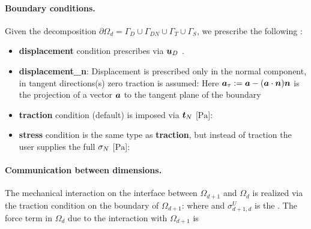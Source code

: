 \paragraph{Boundary conditions.}
Given the decomposition $\partial\Omega_d=\Gamma_D\cup\Gamma_{DN}\cup\Gamma_T\cup\Gamma_S$, we prescribe the following :
\begin{itemize}
\item \textbf{displacement} condition prescribes
via  $\mathbf{\boldsymbol{u}}_D$ .
\item \textbf{displacement\_n}: Displacement is prescribed only in the normal component, in tangent directions(s) zero traction is assumed:
Here $\mathbf{\boldsymbol{a}}_\tau := \mathbf{\boldsymbol{a}} - (\mathbf{\boldsymbol{a}}\cdot\mathbf{\boldsymbol{n}})\mathbf{\boldsymbol{n}}$ is the projection of a vector $\mathbf{\boldsymbol{a}}$ to the tangent plane of the boundary
\item \textbf{traction} condition (default) is imposed via  $\mathbf{\boldsymbol{t}}_N$ [$\mathrm{Pa}$]:
\item \textbf{stress} condition is the same type as \textbf{traction}, but instead of traction the user supplies the full  ${\mathbb{\sigma}}_N$ [$\mathrm{Pa}$]:
\end{itemize}


\paragraph{Communication between dimensions.}
The mechanical interaction on the interface between $\Omega_{d+1}$ and $\Omega_d$ is realized via the traction condition on the boundary of $\Omega_{d+1}$:
where
and $\sigma^U_{d+1,d}$ \units{}{}{} is the .
The force term in $\Omega_d$ due to the interaction with $\Omega_{d+1}$ is


